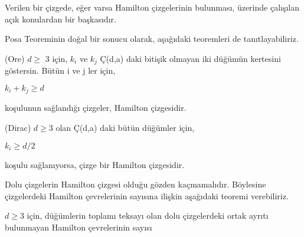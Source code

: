 \documentclass[11pt]{amsbook}
\begin{document}
\chapter{}
Verilen bir çizgede, eğer varsa Hamilton çizgelerinin bulunması, üzerinde çalışılan açık konulardan bir başkasıdır.


Posa Teoreminin doğal bir sonucu olarak, aşağıdaki teoremleri de tanıtlayabiliriz.
\begin{theorem}
(Ore) $d\geq$ 3 için, $k_i$ ve $k_j$ Ç(d,a) daki bitişik olmayan iki düğümün kertesini göstersin. Bütün i ve j ler için,

$k_i + k_j \geq d$

koşulunun sağlandığı çizgeler, Hamilton çizgesidir.
\end{theorem}

\begin{theorem}
(Dirac) $d \geq 3$ olan Ç(d,a) daki bütün düğümler için,

$k_i \geq d/2$

koşulu sağlanıyorsa, çizge bir Hamilton çizgesidir.
\end{theorem}

Dolu çizgelerin Hamilton çizgesi olduğu gözden kaçmamalıdır. Böylesine çizgelerdeki Hamilton çevrelerinin sayısına ilişkin aşağıdaki teoremi verebiliriz.

\begin{theorem}
$d \geq 3$ için, düğümlerin toplamı teksayı olan dolu çizgelerdeki ortak ayrıtı bulunmayan Hamilton çevrelerinin sayısı
\end{theorem}
\end{document}
